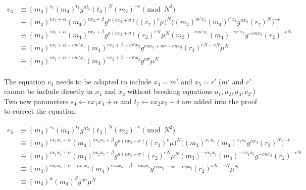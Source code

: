 \begin{equation}
\begin{split}
   v_3 &\equiv (m_3)^{s_1} (m_4)^{t_1} g^{nt_5} (t_3)^{N} (m_2)^{-e} \pmod{N^2} \\
       &\equiv (m_3)^{ex_1 + \alpha} (m_4)^{ex_2 + \beta} g^{n(ex_3 + \sigma)}
       \big((r_2)^e \mu\big)^{N}
       \big((m_3)^{m' x_1} (m_4)^{r' x_2} g^{nx_3} (r_2)^{N}\big)^{-e} \\
       &\equiv (m_3)^{ex_1 + \alpha} (m_4)^{ex_2 + \beta} g^{n(ex_3 + \sigma)}
       (r_2)^{eN} \mu^{N}
       (m_3)^{-e m' x_1} (m_4)^{-e r' x_2} g^{-e nx_3} (r_2)^{-eN} \\
       &\equiv (m_3)^{ex_1 + \alpha - e m' x_1} (m_4)^{ex_2 + \beta - e r' x_2}
       g^{enx_3 + n\sigma - enx_3} (r_2)^{eN - eN} \mu^{N}  \\
       &\equiv (m_3)^{ex_1 + \alpha - e m' x_1} (m_4)^{ex_2 + \beta - e r' x_2}
       g^{n\sigma} \mu^{N}  \\
\end{split}
\end{equation}

The equation $v_3$ needs to be adapted to include $x_4 = m'$ and $x_5 = r'$
($m'$ and $r'$ cannot be include directly in $x_1$ and $x_2$ without breaking
equations $u_1, u_2, u_3, v_2$.) Two new parameters $s_4 \leftarrow ex_1 x_4 +
\alpha$ and $t_7 \leftarrow ex_2 x_5 + \delta$ are added into the proof to
correct the equation.

\begin{equation}
\begin{split}
   v_3 &\equiv (m_3)^{s_4} (m_4)^{t_7} g^{nt_5} (t_3)^{N} (m_2)^{-e} \pmod{N^2} \\
       &\equiv (m_3)^{ex_1x_4 + \alpha} (m_4)^{ex_2x_5 + \beta} g^{n(ex_3 + \sigma)}
       \big((r_2)^e \mu\big)^{N}
       \big((m_3)^{x_1x_4} (m_4)^{x_2x_5} g^{nx_3} (r_2)^{N}\big)^{-e} \\
       &\equiv (m_3)^{ex_1x_4 + \alpha} (m_4)^{ex_2x_5 + \beta} g^{n(ex_3 + \sigma)}
       (r_2)^{eN} \mu^{N}
       (m_3)^{-e x_1x_4} (m_4)^{-e x_2x_5} g^{-e nx_3} (r_2)^{-eN} \\
       &\equiv (m_3)^{ex_1x_4 + \alpha - e x_1x_4} (m_4)^{ex_2x_5 + \beta - e x_2x_5}
       g^{enx_3 + n\sigma - enx_3} (r_2)^{eN - eN} \mu^{N}  \\
       &\equiv (m_3)^{\alpha} (m_4)^{\beta} g^{n\sigma} \mu^{N} \\
\end{split}
\end{equation}

